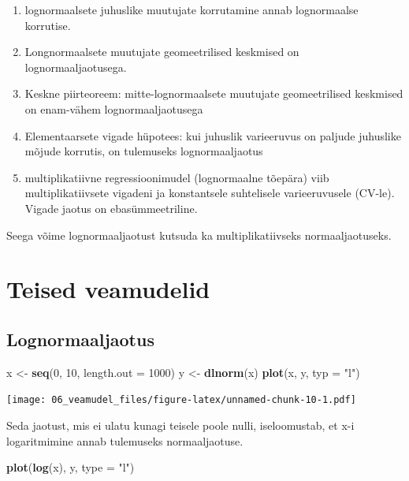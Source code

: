 \documentclass[]{book}
\newenvironment{Shaded}{\begin{snugshade}}{\end{snugshade}}
\newcommand{\DataTypeTok}[1]{\textcolor[rgb]{0.13,0.29,0.53}{#1}}
\newcommand{\DecValTok}[1]{\textcolor[rgb]{0.00,0.00,0.81}{#1}}
\newcommand{\KeywordTok}[1]{\textcolor[rgb]{0.13,0.29,0.53}{\textbf{#1}}}
\newcommand{\NormalTok}[1]{#1}
\newcommand{\StringTok}[1]{\textcolor[rgb]{0.31,0.60,0.02}{#1}}
\begin{document}
\begin{enumerate}
\def\labelenumi{\arabic{enumi}.}
\item
  lognormaalsete juhuslike muutujate korrutamine annab lognormaalse korrutise.
\item
  Longnormaalsete muutujate geomeetrilised keskmised on lognormaaljaotusega.
\item
  Keskne piirteoreem: mitte-lognormaalsete muutujate geomeetrilised keskmised on enam-vähem lognormaaljaotusega
\item
  Elementaarsete vigade hüpotees: kui juhuslik varieeruvus on paljude juhuslike mõjude korrutis, on tulemuseks lognormaaljaotus
\item
  multiplikatiivne regressioonimudel (lognormaalne tõepära) viib multiplikatiivsete vigadeni ja konstantsele suhtelisele varieeruvusele (CV-le). Vigade jaotus on ebasümmeetriline.
\end{enumerate}

Seega võime lognormaaljaotust kutsuda ka multiplikatiivseks normaaljaotuseks.

\hypertarget{teised-veamudelid}{%
\section{Teised veamudelid}\label{teised-veamudelid}}

\hypertarget{lognormaaljaotus}{%
\subsection{Lognormaaljaotus}\label{lognormaaljaotus}}

\begin{Shaded}
\begin{Highlighting}[]
\NormalTok{x <-}\StringTok{ }\KeywordTok{seq}\NormalTok{(}\DecValTok{0}\NormalTok{, }\DecValTok{10}\NormalTok{, }\DataTypeTok{length.out =} \DecValTok{1000}\NormalTok{)}
\NormalTok{y <-}\StringTok{ }\KeywordTok{dlnorm}\NormalTok{(x)}
\KeywordTok{plot}\NormalTok{(x, y, }\DataTypeTok{typ =} \StringTok{"l"}\NormalTok{)}
\end{Highlighting}
\end{Shaded}

\texttt{[image: 06\_veamudel\_files/figure-latex/unnamed-chunk-10-1.pdf]}

Seda jaotust, mis ei ulatu kunagi teisele poole nulli, iseloomustab, et x-i logaritmimine annab tulemuseks normaaljaotuse.

\begin{Shaded}
\begin{Highlighting}[]
\KeywordTok{plot}\NormalTok{(}\KeywordTok{log}\NormalTok{(x), y, }\DataTypeTok{type =} \StringTok{"l"}\NormalTok{)}
\end{Highlighting}
\end{Shaded}
\end{document}

